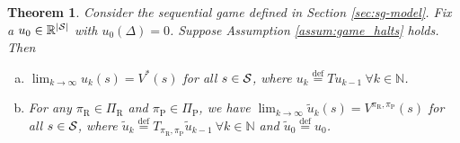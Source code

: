 \documentclass[11pt]{article}
\newtheorem{theorem}{Theorem}
\newcommand{\defeq}{\stackrel{\text{def}}{=}}
\newcommand{\abs}[1]{\left\lvert#1\right\rvert}
\begin{document}
       
          \begin{theorem}
           \label{lem:vi_convergence}
           Consider the sequential game defined in Section \ref{sec:sg-model}. Fix a $u_0 \in \mathbb{R}^{\abs{\cal S}}$ with $u_0(\Delta) = 0$. Suppose Assumption \ref{assum:game_halts} holds. Then
           \begin{enumerate}[(a)]
               \item $\lim_{k \to \infty}u_k(s) = V^*(s)$ for all $s \in {\cal S}$, where $u_{k} \defeq Tu_{k-1} \ \forall k \in \mathbb{N}$.
               \item For any $\pi_\text{R} \in \Pi_\text{R}$ and $\pi_\text{P} \in \Pi_\text{P}$, we have $\lim_{k \to \infty}\tilde u_k(s) = V^{\pi_\text{R},\pi_\text{P}}(s)$ for all $s \in {\cal S}$, where $\tilde u_k \defeq T_{\pi_\text{R},\pi_\text{P}}\tilde u_{k-1} \ \forall k \in \mathbb{N}$ and $\tilde u_0 \defeq u_0$.
           \end{enumerate}
       \end{theorem}
\end{document}
